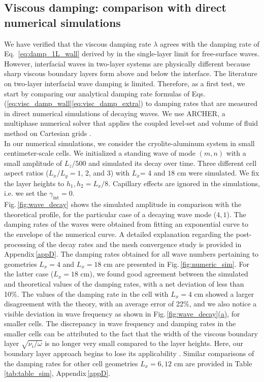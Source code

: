 \documentclass[aps,prfluids,reprint,superscriptaddress]{revtex4-2}
\newcommand{\ii}[1]{\text{#1}}
\begin{document}
\subsection{Viscous damping: comparison with direct numerical simulations}
\label{sec:visc_simulation}

We have verified that the viscous damping rate $\lambda$ agrees with the damping rate of Eq. \,\eqref{eq:damp_1L_wall} derived by \citet{Keulegan1959} in the single-layer limit for free-surface waves. However, interfacial waves in two-layer systems are physically different because sharp viscous boundary layers form above and below the interface. The literature on two-layer interfacial wave damping is limited. Therefore, as a first test, we start by comparing our analytical damping rate formulas of Eqs.\,(\ref{eq:visc_damp_wall}\textendash\ref{eq:visc_damp_extra}) to damping rates that are measured in direct numerical simulations of decaying waves. We use ARCHER, a multiphase numerical solver that applies the coupled level-set and volume of fluid method on Cartesian grids \cite{Menard2007, Vaudor2017}. 
\\
\indent In our numerical simulations, we consider the cryolite-aluminum system in small centimeter-scale cells. We initialized a standing wave of mode $(m,n)$ with a small amplitude of $L_z/500$ and simulated its decay over time. Three different cell aspect ratios ($L_x/L_y=1$, 2, and 3) with $L_x$= 4 and $18$ cm were simulated. We fix the layer heights to $h_1,h_2=L_x/8$. Capillary effects are ignored in the simulations, i.e. we set the $\gamma_{\ii{int}}=0$. 
\\
\indent Fig.\,\ref{fig:wave_decay} shows the simulated amplitude in comparison with the theoretical profile, for the particular case of a decaying wave mode ($4,1$). The damping rates of the waves were obtained from fitting an exponential curve to the envelope of the numerical curve. A detailed explanation regarding the post-processing of the decay rates  and the mesh convergence study is provided in Appendix\,\ref{appD}. The damping rates obtained for all wave numbers pertaining to geometries $L_x=4$ and $L_x=18$ cm are presented in Fig.\,\ref{fig:numeric_sim}. For the latter case ($L_x=18$ cm), we found good agreement between the simulated and theoretical values of the damping rates, with a net deviation of less than 10\%. The values of the damping rate in the cell with $L_x=4$ cm showed a larger disagreement with the theory, with an average error of 22\%, and we also notice a visible deviation in wave frequency as shown in Fig.\,\ref{fig:wave_decay}\hyperref[fig:wave_decay]{(a)}, for smaller cells. The discrepancy in wave frequency and damping rates in the smaller cells can be attributed to the fact that the width of the viscous boundary layer $\sqrt{\nu_i/\omega}$ is no longer very small compared to the layer heights. Here, our boundary layer approach begins to lose its applicability \cite{Huang2025}. Similar comparisons of the damping rates for other cell geometries $L_x=6, 12$ cm are provided in Table\,\ref{tab:table_sim}, Appendix\,\ref{appD}.
\end{document}
